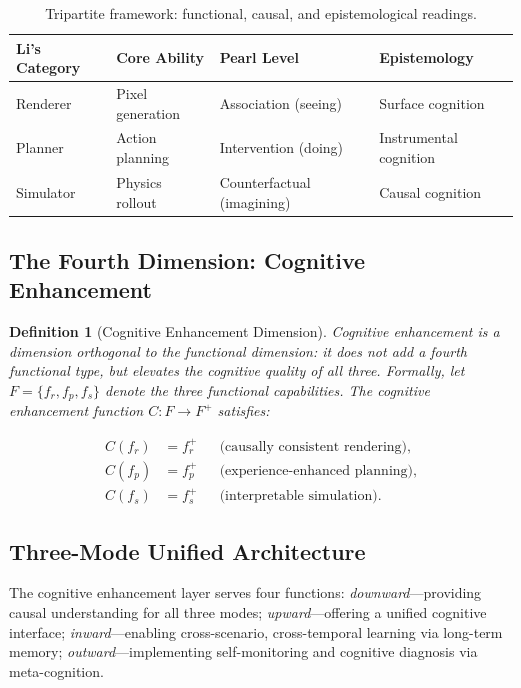 \documentclass[11pt,a4paper]{article}
\newtheorem{definition}{Definition}[section]
\begin{document}
\begin{table}[H]
\centering
\caption{Tripartite framework: functional, causal, and epistemological readings.}\label{tab:tripartite}
\small
\begin{tabularx}{\textwidth}{lXXX}
\toprule
\textbf{Li's Category} & \textbf{Core Ability} & \textbf{Pearl Level} & \textbf{Epistemology} \\
\midrule
Renderer & Pixel generation & Association (seeing) & Surface cognition \\
Planner  & Action planning & Intervention (doing) & Instrumental cognition \\
Simulator & Physics rollout & Counterfactual (imagining) & Causal cognition \\
\bottomrule
\end{tabularx}
\end{table}

\subsection{The Fourth Dimension: Cognitive Enhancement}

\begin{definition}[Cognitive Enhancement Dimension]\label{def:ce-dim}
Cognitive enhancement is a dimension orthogonal to the functional dimension: it does not add a fourth functional type, but elevates the cognitive quality of all three. Formally, let $F = \{f_r, f_p, f_s\}$ denote the three functional capabilities. The cognitive enhancement function $C: F \to F^+$ satisfies:
\end{definition}

\begin{equation}\label{eq:ce-func}
\begin{aligned}
  C(f_r) &= f_r^+ && \text{(causally consistent rendering)}, \\
  C(f_p) &= f_p^+ && \text{(experience-enhanced planning)}, \\
  C(f_s) &= f_s^+ && \text{(interpretable simulation)}.
\end{aligned}
\end{equation}

\subsection{Three-Mode Unified Architecture}

The cognitive enhancement layer serves four functions: \emph{downward}---providing causal understanding for all three modes; \emph{upward}---offering a unified cognitive interface; \emph{inward}---enabling cross-scenario, cross-temporal learning via long-term memory; \emph{outward}---implementing self-monitoring and cognitive diagnosis via meta-cognition.
\end{document}
